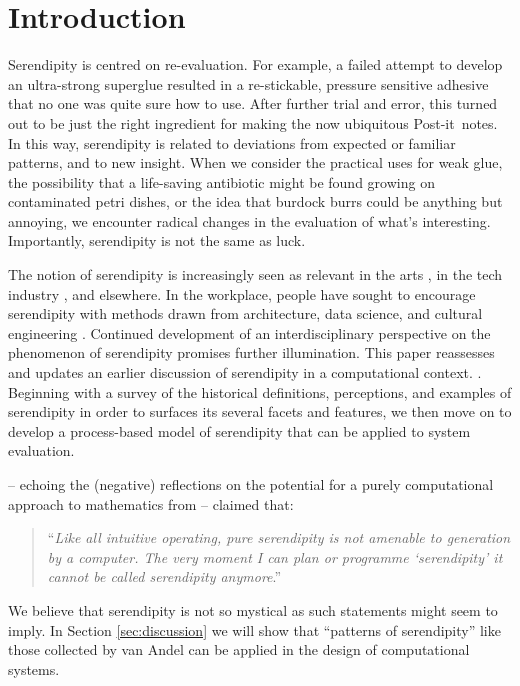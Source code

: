 \section{Introduction}

Serendipity is centred on re-evaluation.  For example, a failed
attempt to develop an ultra-strong superglue resulted in a
re-stickable, pressure sensitive adhesive that no one was quite sure
how to use.  After further trial and error, this turned out to be just
the right ingredient for making the now ubiquitous
Post-it\texttrademark\ notes.
%
In this way, serendipity is related to deviations from expected or
familiar patterns, and to new insight.
%
When we consider the practical uses for weak glue, the possibility
that a life-saving antibiotic might be found growing on contaminated
petri dishes, or the idea that burdock burrs could be anything but
annoying, we encounter radical changes in the evaluation of what's
interesting.  Importantly, serendipity is not the same as luck. 

The notion of serendipity is increasingly seen as relevant in the arts
\cite{mckay-serendipity}, in the tech industry \cite{rao2015breaking},
and elsewhere.  In the workplace, people have sought to encourage
serendipity with methods drawn from architecture, data science, and
cultural engineering
\cite{kakko2009homo,engineering-serendipity,who-moved-cube}.
Continued development of an interdisciplinary perspective on the
phenomenon of serendipity promises further illumination.  This paper
reassesses and updates an earlier discussion of serendipity in a
computational context.  \cite{pease2013discussion}.  Beginning with a
survey of the historical definitions, perceptions, and examples of
serendipity in order to surfaces its several facets and features, we
then move on to develop a process-based model of serendipity that can
be applied to system evaluation.

 -- echoing the
(negative) reflections on the potential
for a purely computational approach to mathematics from  -- claimed that:
\begin{quote}
``\emph{Like all intuitive operating, pure serendipity is not amenable
    to generation by a computer.  The very moment I can plan or
    programme `serendipity' it cannot be called serendipity
    anymore}.'' \citep{van1994anatomy}
\end{quote}
We believe that serendipity is not so mystical as such statements
might seem to imply.  In Section \ref{sec:discussion} we will
show that ``patterns of serendipity'' like those collected by van Andel
can be applied in the design of computational systems.

